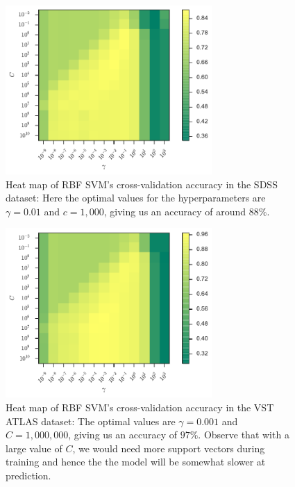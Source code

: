 \begin{figure}[p]
	\centering
	\includegraphics[width=0.7\textwidth]{figures/4_expt1/sdss_grid_rbf}
	\caption[Heat map of RBF SVM's CV accuracy in SDSS]{
		Heat map of RBF SVM's cross-validation accuracy in the SDSS dataset:
		Here the optimal values for the hyperparameters are $\gamma=0.01$
		and $c = 1,000$, giving us an accuracy of around $88\%$.}
	\label{fig:sdss_grid_rbf}
\end{figure}

\begin{figure}[p]
	\centering
	\includegraphics[width=0.7\textwidth]{figures/4_expt1/vstatlas_grid_rbf}
	\caption[Heat map of RBF SVM's CV accuracy in VST ATLAS]{
		Heat map of RBF SVM's cross-validation accuracy in the VST ATLAS dataset:
		The optimal values are $\gamma=0.001$ and $C = 1,000,000$, giving us an accuracy
		of $97\%$. Observe that
		with a large value of $C$, we would need more support vectors during training
		and hence the the model will be somewhat slower at prediction.}
	\label{fig:vstatlas_grid_rbf}
\end{figure}


